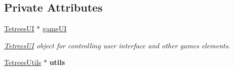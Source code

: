 \subsection*{Private Attributes}
\begin{DoxyCompactItemize}
\item 
\mbox{\label{classTetreesEngine_a01bf1d438236d5f57129ffb22adf59ce}} 
\hyperlink{classTetreesUI}{Tetrees\+UI} $\ast$ \hyperlink{classTetreesEngine_a01bf1d438236d5f57129ffb22adf59ce}{game\+UI}
\begin{DoxyCompactList}\small\item\em \hyperlink{classTetreesUI}{Tetrees\+UI} object for controlling user interface and other games elements. \end{DoxyCompactList}\item 
\mbox{\label{classTetreesEngine_ac4d6256982306ab8a02e18793cb803c0}} 
\hyperlink{classTetreesUtils}{Tetrees\+Utils} $\ast$ {\bfseries utils}
\end{DoxyCompactItemize}
